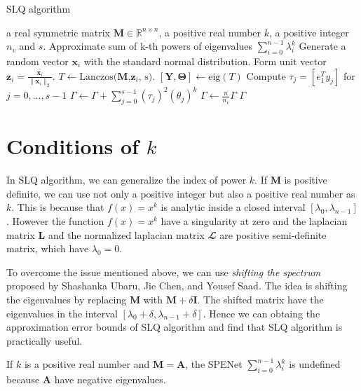\documentclass[senior,final,11pt]{iscs-thesis}
\begin{document}
\begin{algorithm}
    \caption{SLQ algorithm}
    \begin{algorithmic}[1]
    \renewcommand{\algorithmicrequire}{\textbf{Input:}}
    \renewcommand{\algorithmicensure}{\textbf{Output:}}
    \REQUIRE a real symmetric matrix ${\mathbf M} \in {\mathbb R}^{n\times n}$, a positive real number $k$, a positive integer $n_v$ and $s$.
    \ENSURE  Approximate sum of k-th powers of eigenvalues $\sum_{i=0}^{n-1} \lambda_i^k$
     \STATE Generate a random vector $\mathbf{x}_i$ with the standard normal distribution.
     \STATE Form unit vector $\mathbf{z}_i = \frac{\mathbf{x}_i}{\|\mathbf{x}_i\|_2}$.
     \STATE $T \leftarrow \text{Lanczos($\mathbf{M}$,$\mathbf{z}_i$, s)}$.
     \STATE $[\mathbf{Y}, \mathbf{\Theta}] \leftarrow \text{eig}(T)$
     \STATE Compute $\tau_j = [e_1^T y_j]$ for $j=0, ..., s-1$
     \STATE $\Gamma \leftarrow \Gamma + \sum_{j=0}^{s-1} (\tau_j)^2 (\theta_j)^k$
     \ENDFOR
    \STATE $\Gamma \leftarrow \frac{n}{n_v}\Gamma$
    \RETURN $\Gamma$
    \end{algorithmic}
\end{algorithm}


\section{Conditions of $k$}
In SLQ algorithm, we can generalize the index of power $k$. If ${\mathbf M}$ is positive definite, we can use not only a positive integer but also a positive real number as $k$. This is because that $f(x)=x^k$ is analytic inside a closed interval $[\lambda_0, \lambda_{n-1}]$. However the function $f(x)=x^k$ have a singularity at zero and the laplacian matrix ${\mathbf L}$ and the normalized laplacian matrix ${\mathbfcal L}$ are positive semi-definite matrix, which have $\lambda_0 = 0$.

To overcome the issue mentioned above, we can use {\it shifting the spectrum} proposed by Shashanka Ubaru, Jie Chen, and Yousef Saad\cite{ubaru2017fast}. The idea is shifting the eigenvalues by replacing ${\mathbf M}$ with ${\mathbf M}+\delta{\mathbf I}$. The shifted matrix have the eigenvalues in the interval $[\lambda_0 + \delta, \lambda_{n-1}+ \delta]$. Hence we can obtaing the approximation error bounds of SLQ algorithm and find that SLQ algorithm is practically useful.

If $k$ is a positive real number and ${\mathbf M}={\mathbf A}$, the SPENet $\sum_{i=0}^{n-1} \lambda_i^k$ is undefined because ${\mathbf A}$ have negative eigenvalues.
\end{document}
